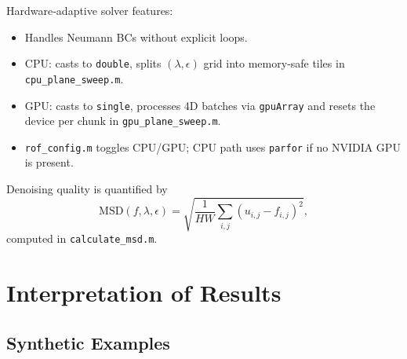 \documentclass[11pt]{article}
\begin{document}
\medskip
Hardware‐adaptive solver features:
\begin{itemize}
  \item Handles Neumann BCs without explicit loops.
  \item CPU: casts to \texttt{double}, splits \((\lambda,\epsilon)\) grid into memory‐safe tiles in \texttt{cpu\_plane\_sweep.m}.
  \item GPU: casts to \texttt{single}, processes 4D batches via \texttt{gpuArray} and resets the device per chunk in \texttt{gpu\_plane\_sweep.m}.
  \item \texttt{rof\_config.m} toggles CPU/GPU; CPU path uses \texttt{parfor} if no NVIDIA GPU is present.
\end{itemize}

Denoising quality is quantified by
\begin{equation}
\mathrm{MSD}(f,\lambda,\epsilon)
= \sqrt{\frac{1}{HW}\sum_{i,j}(u_{i,j}-f_{i,j})^2},
\label{eq:msd}
\end{equation}
computed in \texttt{calculate\_msd.m}.

\section*{Interpretation of Results}
\subsection*{Synthetic Examples}
\end{document}
